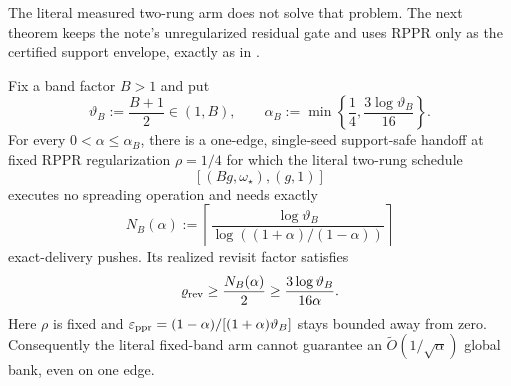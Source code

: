 The literal measured two-rung arm does not solve that problem.  The next
theorem keeps the note's unregularized residual gate and uses RPPR only as
the certified support envelope, exactly as in
.

\begin{theorem}
\label{thm:two-vertex-two-rung-obstruction}
Fix a band factor $B>1$ and put
\[
 \vartheta_B:=\frac{B+1}{2}\in(1,B),
 \qquad
 \alpha_B:=\min\left\{\frac14,
                   \frac{3\log\vartheta_B}{16}\right\}.
\]
For every $0<\alpha\leq\alpha_B$, there is a one-edge, single-seed
support-safe handoff at fixed RPPR regularization $\rho=1/4$ for which the
literal two-rung schedule
\[
 [(Bg,\omega_\star),(g,1)]
\]
executes no spreading operation and needs exactly
\begin{equation}
 N_B(\alpha)
 :=\left\lceil
   \frac{\log\vartheta_B}
        {\log((1+\alpha)/(1-\alpha))}
  \right\rceil
 \label{eq:two-vertex-exact-tail}
\end{equation}
exact-delivery pushes.  Its realized revisit factor satisfies
\begin{equation}
 \varrho_{\rm rev}
 \geq\frac{N_B(\alpha)}2
 \geq\frac{3\log\vartheta_B}{16\alpha}.
 \label{eq:two-vertex-bank-lower}
\end{equation}
Here $\rho$ is fixed and
$\varepsilon_{\mathrm{ppr}}=(1-\alpha)/[(1+\alpha)\vartheta_B]$ stays bounded away from zero.
Consequently the literal fixed-band arm cannot guarantee an
$\widetilde O(1/\sqrt\alpha)$ global bank, even on one edge.
\end{theorem}

